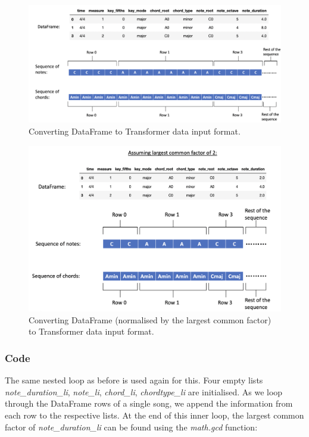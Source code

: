 \begin{figure}
    \centering
    \includegraphics[scale=0.3]{Figures/Transformer 2}
    \decoRule
    \caption{Converting DataFrame to Transformer data input format.}
    \label{fig:Transformer training}
    \end{figure}

\begin{figure}
    \centering
    \includegraphics[scale=0.3]{Figures/Transformer LCF}
    \decoRule
    \caption{Converting DataFrame (normalised by the largest common factor) to Transformer data input format.}
    \label{fig:Transformer LCF}
    \end{figure}

\subsubsection{Code}
The same nested loop as before is used again for this. Four empty lists \emph{note\_duration\_li}, \emph{note\_li}, \emph{chord\_li}, \emph{chordtype\_li} are initialised. As we loop through the DataFrame rows of a single song, we append the information from each row to the respective lists. At the end of this inner loop, the largest common factor of \emph{note\_duration\_li} can be found using the \emph{math.gcd} function:

